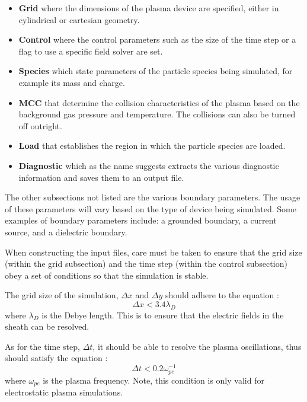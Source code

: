 \begin{itemize}
	\item \textbf{Grid} where the dimensions of the plasma device are specified, either in cylindrical or cartesian geometry.
	\item \textbf{Control} where the control parameters such as the size of the time step or a flag to use a specific field solver are set.
	\item \textbf{Species} which state parameters of the particle species being simulated, for example its mass and charge.
	\item \textbf{MCC} that determine the collision characteristics of the plasma based on the background gas pressure and temperature. The collisions can also be turned off outright.
	\item \textbf{Load} that establishes the region in which the particle species are loaded.
	\item \textbf{Diagnostic} which as the name suggests extracts the various diagnostic information and saves them to an output file.
\end{itemize}

The other subsections not listed are the various boundary parameters. The usage of these parameters will vary based on the type of device being simulated. Some examples of      boundary parameters include: a grounded boundary, a current source, and a dielectric boundary. 

When constructing the input files, care must be taken to ensure that the grid size (within the grid subsection) and the time step (within the control subsection) obey a set of conditions so that the simulation is stable. 

The grid size of the simulation, $\Delta x$ and $\Delta y$ should adhere to the equation \cite{Hockney1988}:
\begin{equation}
	\Delta x < 3.4 \lambda_{D}
\end{equation}
where $\lambda_D$ is the Debye length. This is to ensure that the electric fields in the sheath can be resolved.

As for the time step, $\Delta t$, it should be able to resolve the plasma oscillations, thus should satisfy the equation \cite{tskhakaya_matyash_schneider_taccogna_2007}:
\begin{equation}
	\Delta t < 0.2 \omega_{pe}^{-1}
\end{equation}
where $\omega_{pe}$ is the plasma frequency. Note, this condition is only valid for electrostatic plasma simulations. 


